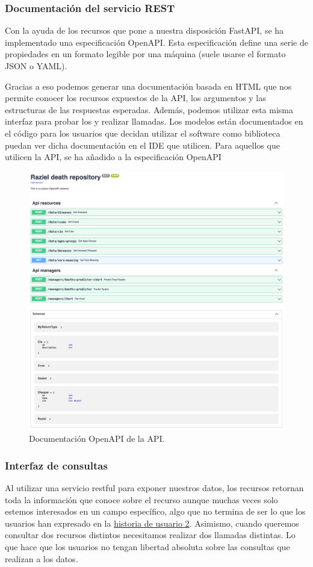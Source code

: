\subsubsection{Documentación del servicio REST}
Con la ayuda de los recursos que pone a nuestra disposición FastAPI, se ha implementado
una especificación OpenAPI. Esta especificación define una serie de propiedades en un
formato legible por una máquina (suele usarse el formato JSON o YAML).

Gracias a eso podemos generar una documentación basada en HTML que nos permite conocer los
recursos expuestos de la API, los argumentos y las estructuras de las respuestas
esperadas. Además, podemos utilizar esta misma interfaz para probar los
 y realizar llamadas. Los modelos están documentados en el código para
los usuarios que decidan utilizar el software como biblioteca puedan ver dicha
documentación en el IDE que utilicen. Para aquellos que utilicen la API, se ha añadido a
la especificación OpenAPI

\begin{figure}[h]
	\centering	
	\includegraphics[width=\textwidth]{doc/logos/imgs/openapi.png}
	\caption{ Documentación OpenAPI de la API. }
    \label{fig:worst_f_value}
\end{figure}

\subsubsection{Interfaz de consultas}
Al utilizar una servicio restful para exponer nuestros datos, los recursos retornan toda
la información que conoce sobre el recurso aunque muchas veces solo estemos interesados en
un campo específico, algo que no termina de ser lo que los usuarios han expresado en la
\hyperref[sec:hu2]{historia de usuario 2}. Asimismo, cuando queremos consultar dos
recursos distintos necesitamos realizar dos llamadas distintas. Lo que hace que los
usuarios no tengan libertad absoluta sobre las consultas que realizan a los datos.

